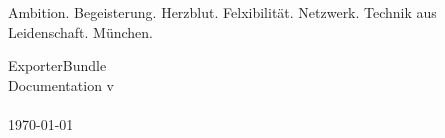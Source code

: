 \begin{titlepage}
\begin{center}
  \begin{minipage}{\textwidth}
    \fontsize{18}{22}
    \selectfont
    \raggedright
    \textcolor{wmark1}{Ambition. Begeisterung.} \textcolor{wmark2}{Herzblut.} \textcolor{wmark1}{Felxibilität. Netzwerk. Technik aus Leidenschaft.} \textcolor{wmark3}{München.}
  \end{minipage}

  \begin{minipage}{0.8\textwidth}
    \vspace{3.5cm}
    \Huge ExporterBundle \\[0.4cm]
    \LARGE Documentation v\version\\
    \\
    \normalsize \today
  \end{minipage}

  \begin{minipage}{\textwidth}

  \end{minipage}
\end{center}
\end{titlepage}